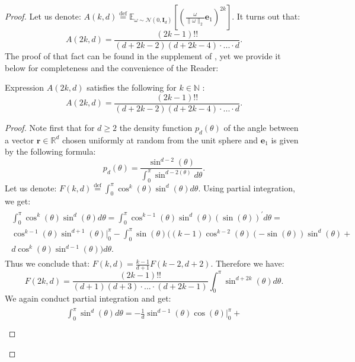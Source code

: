\begin{proof}
Let us denote: $A(k, d) \overset{\mathrm{def}}{=} \mathbb{E}_{\omega \sim \mathcal{N}(0, \mathbf{I}_{d})}[(\frac{\omega}{\|\omega\|_{2}}\mathbf{e}_{1})^{2k}]$. It turns out that:
\begin{equation}
A(2k, d) = \frac{(2k-1)!!}{(d+2k-2)(d+2k-4) \cdot ... \cdot d}.    
\end{equation}
The proof of that fact can be found in the supplement of \citep{geom}, yet we provide it below for completeness and the convenience of the Reader:
\begin{lemma}
Expression $A(2k, d)$ satisfies the following for $k \in \mathbb{N}$ :
\begin{equation}
A(2k, d) = \frac{(2k-1)!!}{(d+2k-2)(d+2k-4) \cdot ... \cdot d}.     
\end{equation}
\end{lemma}
\begin{proof}
Note first that for $d \geq 2$ the density function $p_{d}(\theta)$ of the angle between a vector $\mathbf{r} \in \mathbb{R}^{d}$ chosen uniformly at random from the unit sphere and $\mathbf{e}_{1}$ is given by the following formula:
\begin{equation}
p_{d}(\theta) = \frac{\sin^{d-2}(\theta)}{\int_{0}^{\pi}\sin^{d-2(\theta)}d\theta}.    
\end{equation}
Let us denote: $F(k, d) \overset{\mathrm{def}}{=} \int_{0}^{\pi}\cos^{k}(\theta)\sin^{d}(\theta)d\theta$.
Using partial integration, we get:
\begin{align}
\begin{split}
\int_{0}^{\pi}\cos^{k}(\theta)\sin^{d}(\theta)d\theta=
\int_{0}^{\pi}\cos^{k-1}(\theta)\sin^{d}(\theta)(\sin(\theta))^{\prime}d\theta= \\
\cos^{k-1}(\theta)\sin^{d+1}(\theta)|^{\pi}_{0} - 
\int_{0}^{\pi}\sin(\theta)
(
(k-1)\cos^{k-2}(\theta)(-\sin(\theta))\sin^{d}(\theta)+\\
d\cos^{k}(\theta)\sin^{d-1}(\theta)
)d\theta.
\end{split}
\end{align}
Thus we conclude that: $F(k, d) = \frac{k-1}{d+1}F(k-2, d+2)$.
Therefore we have: 
\begin{equation}
F(2k, d) = \frac{(2k-1)!!}{(d+1)(d+3)\cdot...\cdot(d+2k-1)}
\int_{0}^{\pi}\sin^{d+2k}(\theta) d\theta.
\end{equation}
We again conduct partial integration and get:
\begin{align}
\begin{split}
\int_{0}^{\pi}\sin^{d}(\theta)d\theta = -\frac{1}{d}\sin^{d-1}(\theta)\cos(\theta)|^{\pi}_{0} + \\

\end{split}
\end{align}
\end{proof}
\end{proof}
